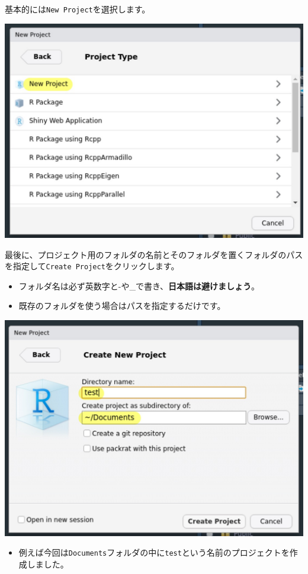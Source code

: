 \documentclass[]{bxjsreport}
\providecommand{\tightlist}{%
  \setlength{\itemsep}{0pt}\setlength{\parskip}{0pt}}
\begin{document}
基本的には\texttt{New\ Project}を選択します。

\includegraphics{figures/workflow4.jpg}

最後に、プロジェクト用のフォルダの名前とそのフォルダを置くフォルダのパスを指定して\texttt{Create\ Project}をクリックします。

\begin{itemize}
\tightlist
\item
  フォルダ名は必ず英数字と-や\_で書き、\textbf{日本語は避けましょう}。
\item
  既存のフォルダを使う場合はパスを指定するだけです。
\end{itemize}

\includegraphics{figures/workflow5.jpg}

\begin{itemize}
\tightlist
\item
  例えば今回は\texttt{Documents}フォルダの中に\texttt{test}という名前のプロジェクトを作成しました。
\end{itemize}
\end{document}
